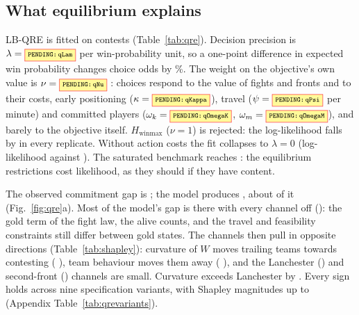 \subsection{What equilibrium explains}
\label{sec:qre}


LB-QRE is fitted on  contests (Table~\ref{tab:qre}).
Decision precision is $\lambda=\V{qLam}$  per win-probability unit, so a one-point difference in expected win probability changes choice odds by \%.
The weight on the objective's own value is $\nu=\V{qNu}$ : choices respond to the value of fights and fronts and to their costs, early positioning ($\kappa=\V{qKappa}$), travel ($\psi=\V{qPsi}$ per minute) and committed players ($\omega_k=\V{qOmegaK}$, $\omega_m=\V{qOmegaM}$), and barely to the objective itself.
$H_{\mathrm{winmax}}$ ($\nu=1$) is rejected: the log-likelihood falls by   in every replicate.
Without action costs the fit collapses to $\lambda=0$ (log-likelihood  against ).
The saturated benchmark reaches : the equilibrium restrictions cost likelihood, as they should if they have content.

The observed commitment gap is \pp{} ; the model produces \pp{} , about  of it (Fig.~\ref{fig:qre}a).
Most of the model's gap is there with every channel off (\pp): the gold term of the fight law, the alive counts, and the travel and feasibility constraints still differ between gold states.
The channels then pull in opposite directions (Table~\ref{tab:shapley}): curvature of $W$ moves trailing teams towards contesting (\pp{} ), team behaviour moves them away (\pp{} ), and the Lanchester () and second-front () channels are small.
Curvature exceeds Lanchester by \pp{} .
Every sign holds across nine specification variants, with Shapley magnitudes up to \pp{} (Appendix Table~\ref{tab:qrevariants}).

